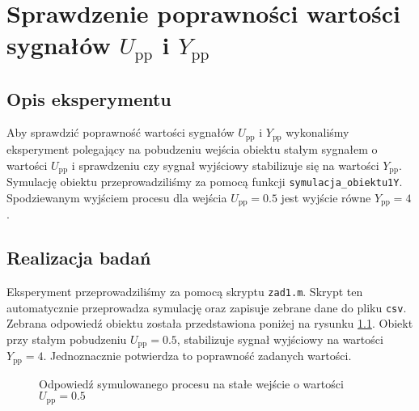 \chapter{Sprawdzenie poprawności wartości sygnałów $U_{\mathrm{pp}}$ i $Y_{\mathrm{pp}}$}
\label{zad1}

\section{Opis eksperymentu}
\label{zad1_opis}
Aby sprawdzić poprawność wartości sygnałów $U_{\mathrm{pp}}$ i $Y_{\mathrm{pp}}$ wykonaliśmy eksperyment polegający na
pobudzeniu wejścia obiektu stałym sygnałem o wartości $U_{\mathrm{pp}}$ i sprawdzeniu czy sygnał wyjściowy stabilizuje 
się na wartości $Y_{\mathrm{pp}}$. Symulację obiektu przeprowadziliśmy za pomocą funkcji 
\verb+symulacja_obiektu1Y+. Spodziewanym wyjściem procesu dla wejścia $U_{\mathrm{pp}} = \num{0.5}$ jest
wyjście równe $Y_{\mathrm{pp}} = \num{4}$.

\section{Realizacja badań}
\label{zad_realizacja}
Eksperyment przeprowadziliśmy za pomocą skryptu \verb+zad1.m+. Skrypt ten automatycznie przeprowadza symulację 
oraz zapisuje zebrane dane do pliku \verb+csv+. Zebrana odpowiedź obiektu została przedstawiona poniżej na rysunku \ref{zad1_output}. 
Obiekt przy stałym pobudzeniu $U_{\mathrm{pp}}=\num{0.5}$, stabilizuje sygnał wyjściowy na wartości $Y_{\mathrm{pp}}=\num{4}$.
Jednoznacznie potwierdza to poprawność zadanych wartości.

\begin{figure}[b]
    \label{zad1_output}
    \centering
    \caption{Odpowiedź symulowanego procesu na stałe wejście o wartości $U_{\mathrm{pp}}=\num{0.5}$}
\end{figure}
